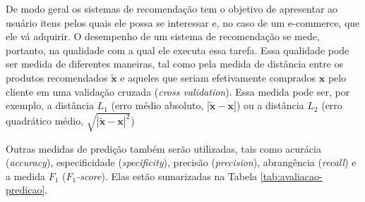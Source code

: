 
De modo geral os sistemas de recomendação tem o objetivo de apresentar ao usuário itens pelos quais ele possa se interessar e, no caso de um e-commerce, que ele vá adquirir. O desempenho de um sistema de recomendação se mede, portanto, na qualidade com a qual ele executa essa tarefa. Essa qualidade pode ser medida de diferentes maneiras, tal como pela medida de distância entre os produtos recomendados $\widetilde{\mathbf{x}}$ e aqueles que seriam efetivamente comprados $\mathbf{x}$ pelo cliente em uma validação cruzada (\textit{cross validation}). Essa medida pode ser, por exemplo, a distância $L_1$ (erro médio absoluto, $\left|\widetilde{\mathbf{x}} - \mathbf{x}\right|$) ou a distância $L_2$ (erro quadrático médio,  $\sqrt{\left|\widetilde{\mathbf{x}} - \mathbf{x}\right|^2}$)

Outras medidas de predição também serão utilizadas, tais como acurácia (\textit{accuracy}), especificidade (\textit{specificity}), precisão (\textit{precision}), abrangência (\textit{recall}) e a medida $F_1$ (\textit{$F_1$-score}). Elas estão sumarizadas na Tabela \ref{tab:avaliacao-predicao}.





